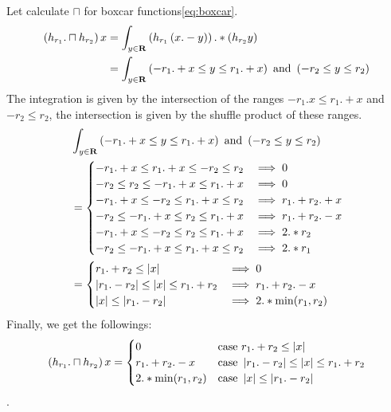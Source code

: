 Let calculate $\sqcap$ for boxcar functions\eqref{eq:boxcar}.
\begin{equation}\begin{split}
	\left({h_{r_1}.\sqcap h_{r_2}}\right)x 
		&= \int_{{y}\in{\mathbf{R}}}\left({h_{r_1}\left({x.-y}\right)}\right).*\left({h_{r_2}y}\right) \\
		&= \int_{{y}\in{\mathbf{R}}}\left({-r_1.+x\le y\le r_1.+x}\right)\text{ and }\left({-r_2\le y\le r_2}\right) \\
\end{split}\end{equation}
The integration is given by the intersection of the ranges
$-r_1.x\le r_1.+x$ and $-r_2\le r_2$, the intersection is given by the
shuffle product of these ranges.
\begin{equation}\begin{split}
	&\int_{{y}\in{\mathbf{R}}}\left({-r_1.+x\le y\le r_1.+x}\right)\text{ and }\left({-r_2\le y\le r_2}\right) \\
	&=\begin{cases}
		-r_1.+x\le r_1.+x\le -r_2\le r_2 &\implies 0 \\
		-r_2\le r_2\le -r_1.+x\le r_1.+x &\implies 0 \\
		-r_1.+x\le -r_2\le r_1.+x\le r_2 &\implies r_1.+r_2.+x \\
		-r_2\le -r_1.+x\le r_2\le r_1.+x &\implies r_1.+r_2.-x \\
		-r_1.+x\le -r_2\le r_2\le r_1.+x &\implies 2.*r_2 \\
		-r_2\le -r_1.+x\le r_1.+x\le r_2 &\implies 2.*r_1 \\
		\end{cases} \\
	&=\begin{cases}
		r_1.+r_2 \le  \left|{x}\right| &\implies 0 \\
		\left|{r_1.-r_2}\right| \le \left|{x}\right| \le r_1.+r_2 &\implies r_1.+r_2.-x \\
		\left|{x}\right| \le  \left|{r_1.-r_2}\right| &\implies 2.*\min(r_1,r_2) \\
		\end{cases} \\
\end{split}\end{equation}
Finally, we get the followings:
\begin{equation}\begin{split}
	\left({h_{r_1}.\sqcap h_{r_2}}\right)x 
		&=\begin{cases}
			0 & \text{case } r_1.+r_2 \le \left|{x}\right| \\
			r_1.+r_2.-x & \text{case } \left|{r_1.-r_2}\right| \le \left|{x}\right| \le r_1.+r_2 \\
			2.*\min(r_1,r_2) & \text{case } \left|{x}\right| \le  \left|{r_1.-r_2}\right| \\
			\end{cases} \\
\end{split}\end{equation}
. 

